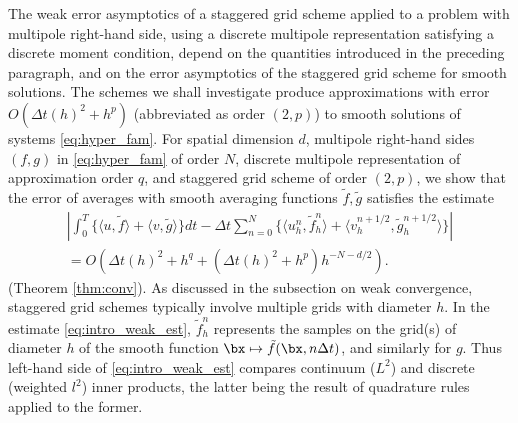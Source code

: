 The weak error asymptotics of a staggered grid scheme applied to a
problem with multipole right-hand side, using a discrete multipole
representation satisfying a discrete moment condition, depend on the
quantities introduced in the preceding paragraph, and on the error
asymptotics of the staggered grid scheme for smooth solutions. The
schemes we shall investigate produce approximations with error $O(\Delta t(h)^2 + h^p)$
(abbreviated as order $(2,p)$) to smooth solutions of systems \ref{eq:hyper_fam}.
For spatial dimension $d$, multipole right-hand sides $(f,g)$  in
\ref{eq:hyper_fam}  of order $N$, discrete multipole
representation of approximation order $q$, and staggered grid scheme
of order $(2,p)$, we show that the error of averages with smooth averaging
functions $\tilde f, \tilde g$ satisfies the estimate
\begin{equation}
\label{eq:intro_weak_est}
\begin{split}
	\left| \int_0^T  \Big\{ \langle u,\tilde f\rangle + \langle v,\tilde g\rangle \Big\} dt -
		\Delta t \sum_{n=0}^N \Big\{ \langle u_h^{n}, \tilde f_h^{n} \rangle +
						 	   \langle v_h^{n+1/2}, \tilde g_h^{n+1/2}  \rangle \Big\} \right|\\
	= O(\Delta t(h)^2 + h^q + (\Delta t(h)^2+h^{p})h^{-N-d/2}).
\end{split}
\end{equation}
(Theorem \ref{thm:conv}). As discussed in the subsection on weak
convergence, staggered grid schemes typically involve multiple grids
with diameter $h$. In the estimate \ref{eq:intro_weak_est},
$\tilde{f}_h^{n}$ represents the samples on the grid(s) of diameter
$h$ of the smooth function $\bx \mapsto \tilde{f}(\bx,n\Delta t)$, and
similarly for $g$. Thus left-hand side of \ref{eq:intro_weak_est}
compares continuum ($L^2$) and discrete (weighted $l^2$) inner
products, the latter being the result of quadrature rules applied to
the former.

